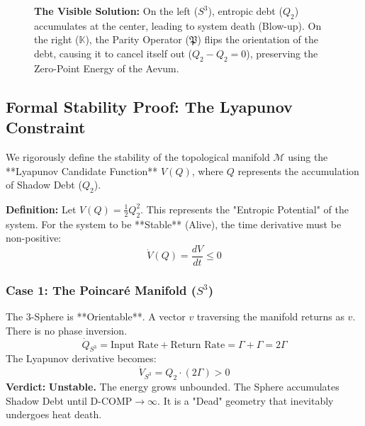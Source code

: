 \documentclass[12pt]{amsart}
\begin{document}
\begin{figure}[htbp]
    \caption{\textbf{The Visible Solution:} On the left ($S^3$), entropic debt ($Q_2$) accumulates at the center, leading to system death (Blow-up). On the right ($\mathbb{K}$), the Parity Operator ($\mathfrak{P}$) flips the orientation of the debt, causing it to cancel itself out ($Q_2 - Q_2 = 0$), preserving the Zero-Point Energy of the Aevum.}
    \label{fig:alqc_solution}
\end{figure}


\subsection{Formal Stability Proof: The Lyapunov Constraint}
\label{appendixA.7.5}

We rigorously define the stability of the topological manifold $\mathcal{M}$ using the **Lyapunov Candidate Function** $V(Q)$, where $Q$ represents the accumulation of Shadow Debt ($Q_2$).

\textbf{Definition:} Let $V(Q) = \frac{1}{2} Q_2^2$. This represents the "Entropic Potential" of the system.
For the system to be **Stable** (Alive), the time derivative must be non-positive:
\begin{equation}
    \dot{V}(Q) = \frac{dV}{dt} \leq 0
\end{equation}

\subsubsection*{Case 1: The Poincaré Manifold ($S^3$)}
The 3-Sphere is **Orientable**. A vector $v$ traversing the manifold returns as $v$. There is no phase inversion.
\[
\dot{Q}_{S^3} = \text{Input Rate} + \text{Return Rate} = \Gamma + \Gamma = 2\Gamma
\]
The Lyapunov derivative becomes:
\begin{equation}
    \dot{V}_{S^3} = Q_2 \cdot (2\Gamma) > 0
\end{equation}
\textbf{Verdict:} \textbf{Unstable.} The energy grows unbounded. The Sphere accumulates Shadow Debt until $\text{D-COMP} \to \infty$. It is a "Dead" geometry that inevitably undergoes heat death.
\end{document}
